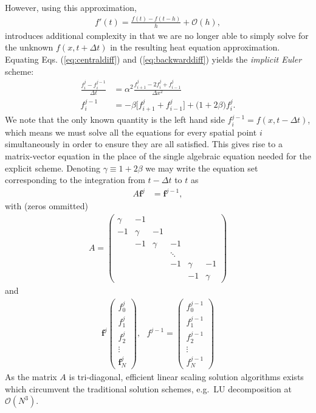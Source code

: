 \documentclass[a4paper, twocolumn]{article}
\begin{document}
However, using this approximation,
\begin{align}
f'(t)=\frac{f(t)-f(t-h)}{h}+\mathcal{O}(h), \label{eq:backwarddiff}
\end{align}
introduces additional complexity in that we are no longer able to simply solve for the unknown $f(x,t+\Delta t)$ in the resulting heat equation approximation. Equating Eqs. (\ref{eq:centraldiff}) and (\ref{eq:backwarddiff}) yields the \textit{implicit Euler} scheme:
\begin{align}
\frac{f_i^{j} - f_i^{j-1}}{\Delta t} &= \alpha^2\frac{f_{i+1}^j - 2f_i^j + f_{i-1}^j}{\Delta x^2} \nonumber \\
%
f_i^{j-1}&= -\beta \big[f_{i+1}^j + f_{i-1}^j\big] + \big(1+2\beta\big)f_i^j.
\end{align}
We note that the only known quantity is the left hand side $f_i^{j-1}=f(x,t-\Delta t)$, which means we must solve all the equations for every spatial point $i$ simultaneously in order to ensure they are all satisfied. This gives rise to a matrix-vector equation in the place of the single algebraic equation needed for the explicit scheme. Denoting $\gamma\equiv 1+2\beta$ we may write the equation set corresponding to the integration from $t-\Delta t$ to $t$ as
\begin{align}
A\mathbf{f}^j&=\mathbf{f}^{j-1},
\end{align}
with (zeros ommitted)
\begin{align}
A = \begin{pmatrix}
\gamma & -1 & \\
-1 & \gamma & -1 \\
 & -1 & \gamma & -1 \\
 & & &  \ddots \\
 & & & -1 & \gamma & -1 \\
 & & & & -1 & \gamma 
\end{pmatrix}
\end{align}
and
\begin{align}
\mathbf{f}^j
\begin{pmatrix}
f_0^{j} \\
f_1^{j} \\
f_2^{j} \\
\vdots \\
\mathbf{f}_N^{j}
\end{pmatrix}, \ \ \ 
f^{j-1}=\begin{pmatrix}
f_0^{j-1} \\
f_1^{j-1} \\
f_2^{j-1} \\
\vdots \\
f_N^{j-1}
\end{pmatrix} 
\end{align}
As the matrix $A$ is tri-diagonal, efficient linear scaling solution algorithms exists which circumvent the traditional solution schemes, e.g.\ LU decomposition at $\mathcal{O}(N^3)$.
\end{document}
